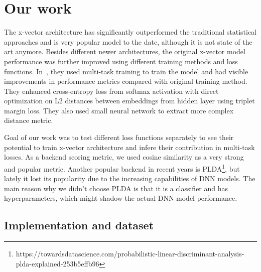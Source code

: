 \section{Our work}
The x-vector architecture has significantly outperformed the traditional statistical approaches and is very popular model to the date, although it is not state of the art anymore. Besides different newer architectures, the original x-vector model performance was further improved using different training methods and loss functions. In~\cite{x_vectors_triplet}, they used multi-task training to train the model and had visible improvements in performance metrics compared with original training method. They enhanced cross-entropy loss from softmax activation with direct optimization on L2 distances between embeddings from hidden layer using triplet margin loss. They also used small neural network to extract more complex distance metric.

\medskip
Goal of our work was to test different loss functions separately to see their potential to train x-vector architecture and infere their contribution in multi-task losses. As a backend scoring metric, we used cosine similarity as a very strong and popular metric. Another popular backend in recent years is PLDA\footnote{https://towardsdatascience.com/probabilistic-linear-discriminant-analysis-plda-explained-253b5effb96}, but lately it lost its popularity due to the increasing capabilities of DNN models. The main reason why we didn't choose PLDA is that it is a classifier and has hyperparameters, which might shadow the actual DNN model performance. 

\subsection*{Implementation and dataset}

